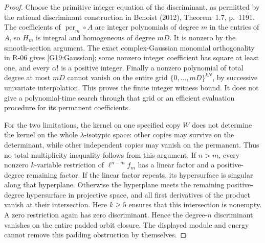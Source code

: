 \begin{proof}
Choose the primitive integer equation of the discriminant,
as permitted by the rational discriminant construction in
Benoist (2012), Theorem~1.7, p.~1191. The coefficients of
$\operatorname{per}_m\circ A$ are integer polynomials of degree
$m$ in the entries of $A$, so $H_m$ is integral and homogeneous
of degree $mD$. It is nonzero by the smooth-section argument.
The exact complex-Gaussian monomial orthogonality in R-06 gives
\eqref{G19:Gaussian}; some nonzero integer coefficient has
square at least one, and every $\alpha!$ is a positive integer.
Finally a nonzero polynomial of total degree at most $mD$
cannot vanish on the entire grid
$\{0,\ldots,mD\}^{kN}$, by successive univariate interpolation.
This proves the finite integer witness bound. It does not
give a polynomial-time search through that grid or an efficient
evaluation procedure for its permanent coefficients.

For the two limitations, the kernel on one specified copy $W$
does not determine the kernel on the whole $\lambda$-isotypic
space: other copies may survive on the determinant, while other
independent copies may vanish on the permanent. Thus no total
multiplicity inequality follows from this argument.
If $n>m$, every nonzero $k$-variable restriction of
$\ell^{n-m}f_m$ has a linear factor and a positive-degree
remaining factor. If the linear factor repeats, its hypersurface
is singular along that hyperplane. Otherwise the hyperplane
meets the remaining positive-degree hypersurface in projective
space, and all first derivatives of the product vanish at their
intersection. Here $k\geq5$ ensures that this intersection is
nonempty. A zero restriction again has zero discriminant.
Hence the degree-$n$ discriminant vanishes on the entire padded
orbit closure. The displayed module and energy cannot remove
this padding obstruction by themselves.
\end{proof}

